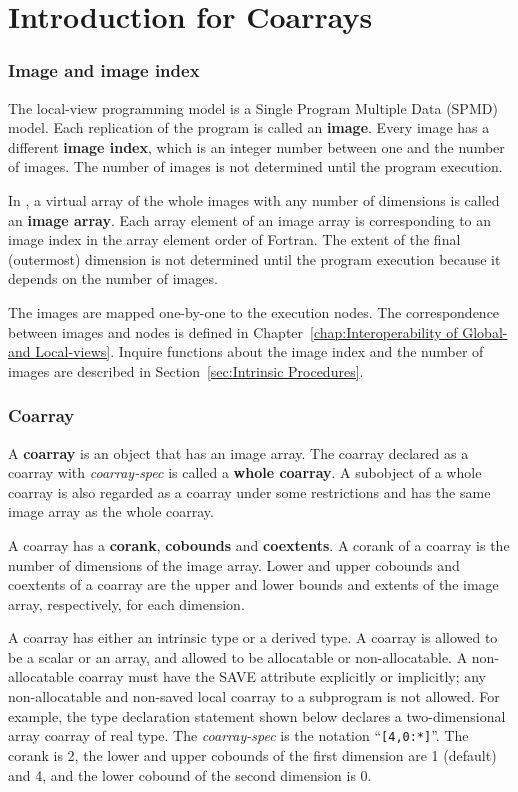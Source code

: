 \section{Introduction for Coarrays}
\label{sec:Introduction for Coarrays}

\subsubsection*{Image and image index}
The local-view programming model is a Single Program Multiple Data (SPMD) model.
Each replication of the program is called an {\bf image}.
Every image has a different {\bf image index}, which is an integer number 
between one and the number of images.
The number of images is not determined until the program execution.

In {\XMP}, a virtual array of the whole images with any number of dimensions 
is called an {\bf image array}. 
Each array element of an image array is corresponding to an image index
in the array element order of Fortran.
The extent of the final (outermost) dimension is not determined until
the program execution because it depends on the number of images.

The images are mapped one-by-one to the execution nodes.
The correspondence between images and nodes is defined in 
Chapter~\ref{chap:Interoperability of Global- and Local-views}.
Inquire functions about the image index and the number of images 
are described in Section~\ref{sec:Intrinsic Procedures}.


\subsubsection*{Coarray}
A {\bf coarray} is an object that has an image array.
The coarray declared as a coarray with {\it coarray-spec} is
called a {\bf whole coarray}.
A subobject of a whole coarray is also regarded as a coarray under
some restrictions and has the same image array as the whole coarray.

A coarray has a {\bf corank}, {\bf cobounds} and {\bf coextents}.
A corank of a coarray is the number of dimensions of the image array.
Lower and upper cobounds and coextents of a coarray are
the upper and lower bounds and extents of the image array, respectively,
for each dimension.

{\onlyF}
A coarray has either an intrinsic type or a derived type.
A coarray is allowed to be a scalar or an array,
and allowed to be allocatable or non-allocatable.
A non-allocatable coarray must have the SAVE attribute explicitly or
implicitly; any non-allocatable and non-saved local coarray to a subprogram
is not allowed.
For example, the type declaration statement shown below declares a 
two-dimensional array coarray of real type. 
The {\it coarray-spec} is the notation ``{\tt [4,0:*]}''.
The corank is 2, the lower and upper cobounds of the first dimension 
are 1 (default) and 4, and the lower cobound of the second dimension is 0.

